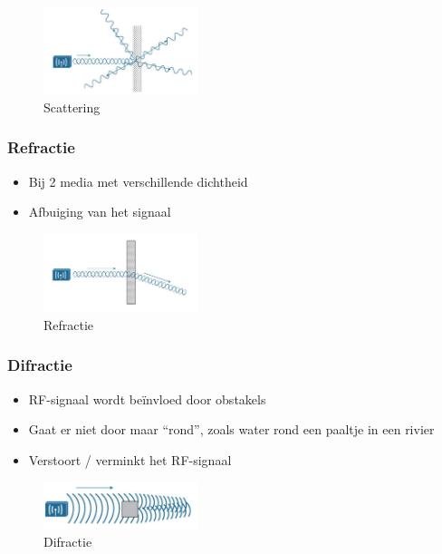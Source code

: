 \documentclass{article}
\begin{document}
\begin{figure}[H]
    \centering
    \includegraphics[width=0.4\textwidth]{Screenshot_20200309_124533.png}
    \caption{Scattering}
\end{figure}

\subsubsection{Refractie}
\begin{itemize}
    \item Bij 2 media met verschillende dichtheid
    \item Afbuiging van het signaal
\end{itemize}

\begin{figure}[H]
    \centering
    \includegraphics[width=0.4\textwidth]{Screenshot_20200309_124610.png}
    \caption{Refractie}
\end{figure}

\subsubsection{Difractie}
\begin{itemize}
    \item RF-signaal wordt beïnvloed door obstakels
    \item Gaat er niet door maar “rond”, zoals water rond een paaltje in een rivier
    \item Verstoort / verminkt het RF-signaal
\end{itemize}

\begin{figure}[H]
    \centering
    \includegraphics[width=0.4\textwidth]{Screenshot_20200309_124659.png}
    \caption{Difractie}
\end{figure}
\end{document}
